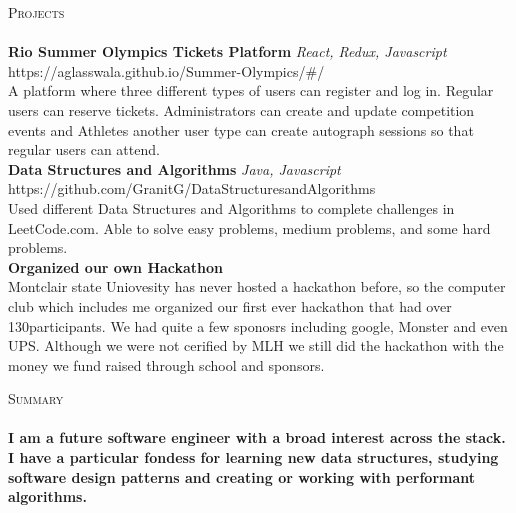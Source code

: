 \documentclass[a4paper]{article}
\newcommand{\lineunder} {
    \vspace*{-8pt} \\
    \hspace*{-18pt} \hrulefill \\
}
\newcommand{\header} [1] {
    {\hspace*{-18pt}\vspace*{6pt} \textsc{#1}}
    \vspace*{-6pt} \lineunder
}
\begin{document}
\header{Projects}
{\textbf{Rio Summer Olympics Tickets Platform}} {\sl React, Redux, Javascript} \hfill https://aglasswala.github.io/Summer-Olympics/\#/\\
A platform where three different types of users can register and log in. Regular users can reserve tickets. Administrators can create and update competition events and Athletes another user type can create autograph sessions so that regular users can attend.\\
\vspace*{2mm}
{\textbf{Data Structures and Algorithms}} {\sl Java, Javascript} \hfill https://github.com/GranitG/DataStructuresandAlgorithms\\
Used different Data Structures and Algorithms to complete challenges in LeetCode.com. Able to solve easy problems, medium problems, and some hard problems.\\
\vspace*{2mm}
{\textbf{Organized our own Hackathon}}\\
Montclair state Uniovesity has never hosted a hackathon before, so the computer club which includes me organized our first ever hackathon that had over 130participants. We had quite a few sponosrs including google, Monster and even UPS. Although we were not cerified by MLH we still did the hackathon with the money we fund raised through school and sponsors.\\
\vspace*{2mm}

\header{Summary}
\textbf{I am a future software engineer with a broad interest across the stack. I have a particular fondess for learning new data structures, studying software design patterns and creating or working with performant algorithms.}\\

\vspace*{2mm}

\ 
\end{document}
